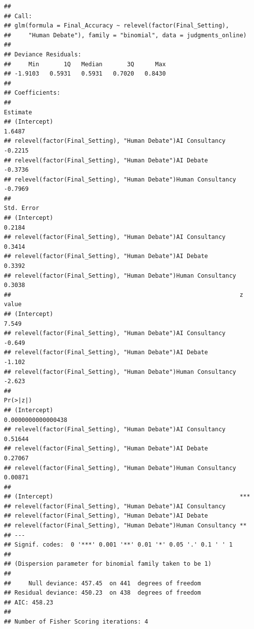 \documentclass[
]{article}
\begin{document}
\begin{verbatim}
## 
## Call:
## glm(formula = Final_Accuracy ~ relevel(factor(Final_Setting), 
##     "Human Debate"), family = "binomial", data = judgments_online)
## 
## Deviance Residuals: 
##     Min       1Q   Median       3Q      Max  
## -1.9103   0.5931   0.5931   0.7020   0.8430  
## 
## Coefficients:
##                                                                 Estimate
## (Intercept)                                                       1.6487
## relevel(factor(Final_Setting), "Human Debate")AI Consultancy     -0.2215
## relevel(factor(Final_Setting), "Human Debate")AI Debate          -0.3736
## relevel(factor(Final_Setting), "Human Debate")Human Consultancy  -0.7969
##                                                                 Std. Error
## (Intercept)                                                         0.2184
## relevel(factor(Final_Setting), "Human Debate")AI Consultancy        0.3414
## relevel(factor(Final_Setting), "Human Debate")AI Debate             0.3392
## relevel(factor(Final_Setting), "Human Debate")Human Consultancy     0.3038
##                                                                 z value
## (Intercept)                                                       7.549
## relevel(factor(Final_Setting), "Human Debate")AI Consultancy     -0.649
## relevel(factor(Final_Setting), "Human Debate")AI Debate          -1.102
## relevel(factor(Final_Setting), "Human Debate")Human Consultancy  -2.623
##                                                                           Pr(>|z|)
## (Intercept)                                                     0.0000000000000438
## relevel(factor(Final_Setting), "Human Debate")AI Consultancy               0.51644
## relevel(factor(Final_Setting), "Human Debate")AI Debate                    0.27067
## relevel(factor(Final_Setting), "Human Debate")Human Consultancy            0.00871
##                                                                    
## (Intercept)                                                     ***
## relevel(factor(Final_Setting), "Human Debate")AI Consultancy       
## relevel(factor(Final_Setting), "Human Debate")AI Debate            
## relevel(factor(Final_Setting), "Human Debate")Human Consultancy ** 
## ---
## Signif. codes:  0 '***' 0.001 '**' 0.01 '*' 0.05 '.' 0.1 ' ' 1
## 
## (Dispersion parameter for binomial family taken to be 1)
## 
##     Null deviance: 457.45  on 441  degrees of freedom
## Residual deviance: 450.23  on 438  degrees of freedom
## AIC: 458.23
## 
## Number of Fisher Scoring iterations: 4
\end{verbatim}
\end{document}
